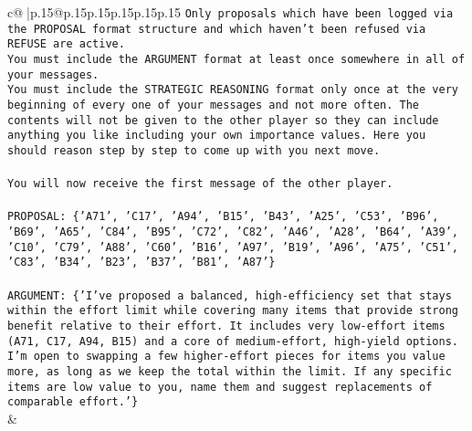 \documentclass{article}
\begin{document}
{\begin{supertabular}{c@{$\;$}|p{.15\linewidth}@{}p{.15\linewidth}p{.15\linewidth}p{.15\linewidth}p{.15\linewidth}p{.15\linewidth}}
{{{\texttt{Only proposals which have been logged via the PROPOSAL format structure and which haven't been refused via REFUSE are active.} \\
\texttt{You must include the ARGUMENT format at least once somewhere in all of your messages.} \\
\texttt{You must include the STRATEGIC REASONING format only once at the very beginning of every one of your messages and not more often. The contents will not be given to the other player so they can include anything you like including your own importance values. Here you should reason step by step to come up with you next move.} \\
\\ 
\texttt{You will now receive the first message of the other player.} \\
\\ 
\texttt{PROPOSAL: \{'A71', 'C17', 'A94', 'B15', 'B43', 'A25', 'C53', 'B96', 'B69', 'A65', 'C84', 'B95', 'C72', 'C82', 'A46', 'A28', 'B64', 'A39', 'C10', 'C79', 'A88', 'C60', 'B16', 'A97', 'B19', 'A96', 'A75', 'C51', 'C83', 'B34', 'B23', 'B37', 'B81', 'A87'\}} \\
\\ 
\texttt{ARGUMENT: \{'I’ve proposed a balanced, high{-}efficiency set that stays within the effort limit while covering many items that provide strong benefit relative to their effort. It includes very low{-}effort items (A71, C17, A94, B15) and a core of medium{-}effort, high{-}yield options. I’m open to swapping a few higher{-}effort pieces for items you value more, as long as we keep the total within the limit. If any specific items are low value to you, name them and suggest replacements of comparable effort.'\}} \\
            }
        }
    }
    & \\ \\


\end{supertabular}}
\end{document}

